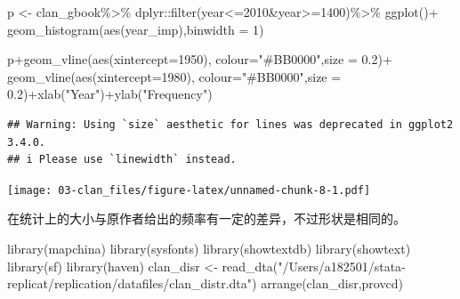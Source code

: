 \documentclass[
  oneside]{book}
\newenvironment{Shaded}{\begin{snugshade}}{\end{snugshade}}
\newcommand{\AttributeTok}[1]{\textcolor[rgb]{0.77,0.63,0.00}{#1}}
\newcommand{\DecValTok}[1]{\textcolor[rgb]{0.00,0.00,0.81}{#1}}
\newcommand{\FloatTok}[1]{\textcolor[rgb]{0.00,0.00,0.81}{#1}}
\newcommand{\FunctionTok}[1]{\textcolor[rgb]{0.00,0.00,0.00}{#1}}
\newcommand{\NormalTok}[1]{#1}
\newcommand{\OtherTok}[1]{\textcolor[rgb]{0.56,0.35,0.01}{#1}}
\newcommand{\SpecialCharTok}[1]{\textcolor[rgb]{0.00,0.00,0.00}{#1}}
\newcommand{\StringTok}[1]{\textcolor[rgb]{0.31,0.60,0.02}{#1}}
\begin{document}
\begin{Shaded}
\begin{Highlighting}[]
\NormalTok{p }\OtherTok{\textless{}{-}}\NormalTok{ clan\_gbook}\SpecialCharTok{\%\textgreater{}\%}
\NormalTok{  dplyr}\SpecialCharTok{::}\FunctionTok{filter}\NormalTok{(year}\SpecialCharTok{\textless{}=}\DecValTok{2010}\SpecialCharTok{\&}\NormalTok{year}\SpecialCharTok{\textgreater{}=}\DecValTok{1400}\NormalTok{)}\SpecialCharTok{\%\textgreater{}\%}
  \FunctionTok{ggplot}\NormalTok{()}\SpecialCharTok{+}
    \FunctionTok{geom\_histogram}\NormalTok{(}\FunctionTok{aes}\NormalTok{(year\_imp),}\AttributeTok{binwidth =} \DecValTok{1}\NormalTok{)}

\NormalTok{p}\SpecialCharTok{+}\FunctionTok{geom\_vline}\NormalTok{(}\FunctionTok{aes}\NormalTok{(}\AttributeTok{xintercept=}\DecValTok{1950}\NormalTok{), }\AttributeTok{colour=}\StringTok{"\#BB0000"}\NormalTok{,}\AttributeTok{size =} \FloatTok{0.2}\NormalTok{)}\SpecialCharTok{+}
  \FunctionTok{geom\_vline}\NormalTok{(}\FunctionTok{aes}\NormalTok{(}\AttributeTok{xintercept=}\DecValTok{1980}\NormalTok{), }\AttributeTok{colour=}\StringTok{"\#BB0000"}\NormalTok{,}\AttributeTok{size =} \FloatTok{0.2}\NormalTok{)}\SpecialCharTok{+}\FunctionTok{xlab}\NormalTok{(}\StringTok{"Year"}\NormalTok{)}\SpecialCharTok{+}\FunctionTok{ylab}\NormalTok{(}\StringTok{"Frequency"}\NormalTok{)}
\end{Highlighting}
\end{Shaded}

\begin{verbatim}
## Warning: Using `size` aesthetic for lines was deprecated in ggplot2 3.4.0.
## i Please use `linewidth` instead.
\end{verbatim}

\texttt{[image: 03-clan\_files/figure-latex/unnamed-chunk-8-1.pdf]}

在统计上的大小与原作者给出的频率有一定的差异，不过形状是相同的。

\begin{Shaded}
\begin{Highlighting}[]
\FunctionTok{library}\NormalTok{(mapchina)}
\FunctionTok{library}\NormalTok{(sysfonts)}
\FunctionTok{library}\NormalTok{(showtextdb)}
\FunctionTok{library}\NormalTok{(showtext)}
\FunctionTok{library}\NormalTok{(sf)}
\FunctionTok{library}\NormalTok{(haven)}
\NormalTok{clan\_disr }\OtherTok{\textless{}{-}} \FunctionTok{read\_dta}\NormalTok{(}\StringTok{"/Users/a182501/stata{-}replicat/replication/datafiles/clan\_distr.dta"}\NormalTok{)}
\FunctionTok{arrange}\NormalTok{(clan\_disr,provcd)}
\end{Highlighting}
\end{Shaded}
\end{document}
